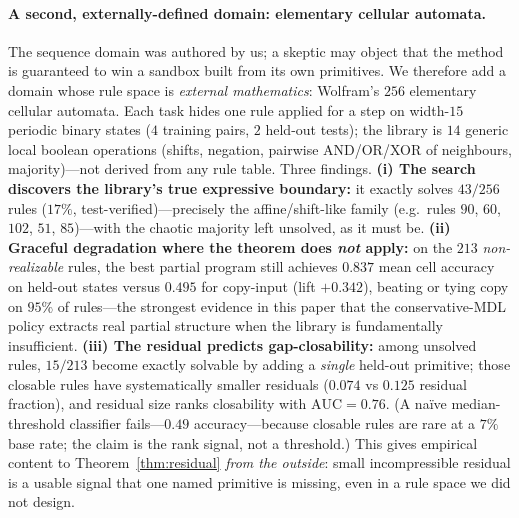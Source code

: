 \paragraph{A second, externally-defined domain: elementary cellular automata.} The sequence domain was
authored by us; a skeptic may object that the method is guaranteed to win a sandbox built from its own
primitives. We therefore add a domain whose rule space is \emph{external mathematics}: Wolfram's $256$
elementary cellular automata. Each task hides one rule applied for a step on width-$15$ periodic binary
states ($4$ training pairs, $2$ held-out tests); the library is $14$ generic local boolean operations
(shifts, negation, pairwise AND/OR/XOR of neighbours, majority)---not derived from any rule table. Three
findings. \textbf{(i) The search discovers the library's true expressive boundary:} it exactly solves
$43/256$ rules ($17\%$, test-verified)---precisely the affine/shift-like family (e.g.\ rules $90$, $60$,
$102$, $51$, $85$)---with the chaotic majority left unsolved, as it must be. \textbf{(ii) Graceful
degradation where the theorem does \emph{not} apply:} on the $213$ \emph{non-realizable} rules, the best
partial program still achieves $0.837$ mean cell accuracy on held-out states versus $0.495$ for copy-input
(lift $+0.342$), beating or tying copy on $95\%$ of rules---the strongest evidence in this paper that the
conservative-MDL policy extracts real partial structure when the library is fundamentally insufficient.
\textbf{(iii) The residual predicts gap-closability:} among unsolved rules, $15/213$ become exactly solvable
by adding a \emph{single} held-out primitive; those closable rules have systematically smaller residuals
($0.074$ vs $0.125$ residual fraction), and residual size ranks closability with $\mathrm{AUC}=0.76$. (A
na\"ive median-threshold classifier fails---$0.49$ accuracy---because closable rules are rare at a $7\%$ base
rate; the claim is the rank signal, not a threshold.) This gives empirical content to
Theorem~\ref{thm:residual} \emph{from the outside}: small incompressible residual is a usable signal that one
named primitive is missing, even in a rule space we did not design.

